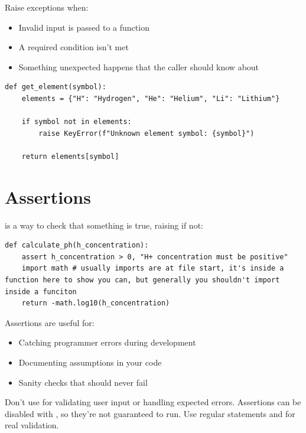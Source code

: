 Raise exceptions when:
\begin{itemize}
    \item Invalid input is passed to a function
    \item A required condition isn't met
    \item Something unexpected happens that the caller should know about
\end{itemize}

\begin{lstlisting}
def get_element(symbol):
    elements = {"H": "Hydrogen", "He": "Helium", "Li": "Lithium"}

    if symbol not in elements:
        raise KeyError(f"Unknown element symbol: {symbol}")

    return elements[symbol]
\end{lstlisting}

\section{Assertions}
\label{sec:assertions}

 is a way to check that something is true, raising  if not:

\begin{lstlisting}
def calculate_ph(h_concentration):
    assert h_concentration > 0, "H+ concentration must be positive"
    import math # usually imports are at file start, it's inside a function here to show you can, but generally you shouldn't import inside a funciton
    return -math.log10(h_concentration)
\end{lstlisting}

Assertions are useful for:
\begin{itemize}
    \item Catching programmer errors during development
    \item Documenting assumptions in your code
    \item Sanity checks that should never fail
\end{itemize}

\begin{warning}
Don't use  for validating user input or handling expected errors. Assertions can be disabled with , so they're not guaranteed to run. Use regular  statements and  for real validation.
\end{warning}

